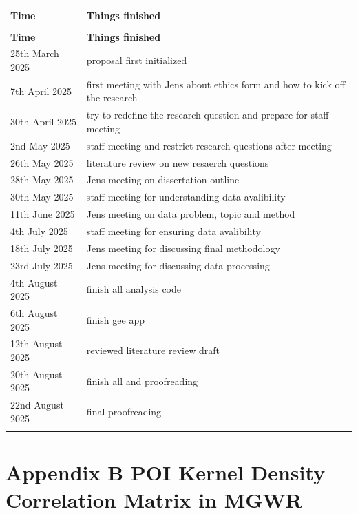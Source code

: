 \documentclass[
  12pt,
  oneside]{book}
\begin{document}

\begin{longtable}[t]{>{\raggedright\arraybackslash}p{3cm}>{\raggedright\arraybackslash}p{10cm}}
\toprule
\textbf{Time} & \textbf{Things finished}\\
\midrule
\endfirsthead
\multicolumn{2}{@{}l}{\textit{(continued)}}\\
\toprule
\textbf{Time} & \textbf{Things finished}\\
\midrule
\endhead

\endfoot
\bottomrule
\endlastfoot
25th March 2025 & proposal first initialized\\
7th April 2025 & first meeting with Jens about ethics form and how to kick off the research\\
30th April 2025 & try to redefine the research question and prepare for staff meeting\\
2nd May 2025 & staff meeting and restrict research questions after meeting\\
26th May 2025 & literature review on new resaerch questions\\
\addlinespace
28th May 2025 & Jens meeting on dissertation outline\\
30th May 2025 & staff meeting for understanding data avalibility\\
11th June 2025 & Jens meeting on data problem, topic and method\\
4th July 2025 & staff meeting for ensuring data avalibility\\
18th July 2025 & Jens meeting for discussing final methodology\\
\addlinespace
23rd July 2025 & Jens meeting for discussing data processing\\
4th August 2025 & finish all analysis code\\
6th August 2025 & finish gee app\\
12th August 2025 & reviewed literature review draft\\
20th August 2025 & finish all and proofreading\\
\addlinespace
22nd August 2025 & final proofreading\\*
\end{longtable}

\chapter*{Appendix B POI Kernel Density Correlation Matrix in MGWR}\label{appendix-b-poi-kernel-density-correlation-matrix-in-mgwr}
\end{document}
